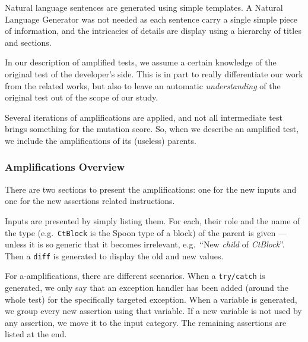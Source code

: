 \documentclass[a4paper,11pt]{sdm_internship}
\theoremstyle{definition}
\begin{document}


Natural language sentences are generated using simple templates.
A Natural Language Generator was not needed as each sentence carry a single simple piece of information, and the intricacies of details are display using a hierarchy of titles and sections.

In our description of amplified tests, we assume a certain knowledge of the original test of the developer's side.
This is in part to really differentiate our work from the related works, but also to leave an automatic \textit{understanding} of the original test out of the scope of our study.

Several iterations of amplifications are applied, and not all intermediate test brings something for the mutation score.
So, when we describe an amplified test, we include the amplifications of its (useless) parents.

\subsubsection{Amplifications Overview}%
\label{sssec:amp_overview}
There are two sections to present the amplifications: one for the new inputs and one for the new assertions related instructions.

Inputs are presented by simply listing them.
For each, their role and the name of the type (e.g.\ \texttt{CtBlock} is the Spoon type of a block) of the parent is given --- unless it is so generic that it becomes irrelevant, e.g.\ ``New \textit{child} of \textit{CtBlock}''.
Then a \texttt{diff} is generated to display the old and new values.

For a-amplifications, there are different scenarios.
When a \texttt{try/catch} is generated, we only say that an exception handler has been added (around the whole test) for the specifically targeted exception.
When a variable is generated, we group every new assertion using that variable.
If a new variable is not used by any assertion, we move it to the input category.
The remaining assertions are listed at the end.
\end{document}
